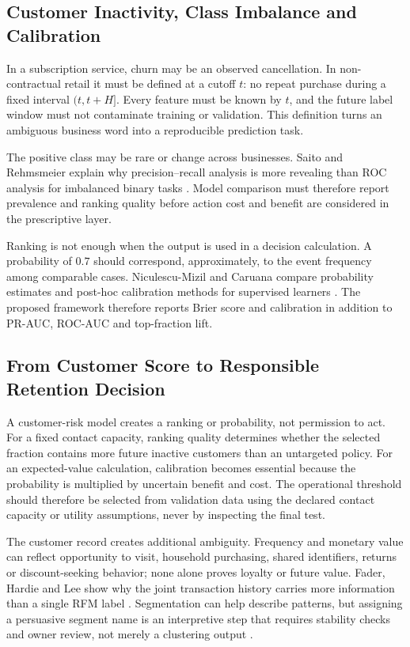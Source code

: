 \subsection{Customer Inactivity, Class Imbalance and Calibration}

In a subscription service, churn may be an observed cancellation. In
non-contractual retail it must be defined at a cutoff $t$: no repeat purchase
during a fixed interval $(t,t+H]$. Every feature must be known by $t$, and the
future label window must not contaminate training or validation. This definition
turns an ambiguous business word into a reproducible prediction task.

The positive class may be rare or change across businesses. Saito and
Rehmsmeier explain why precision--recall analysis is more revealing than ROC
analysis for imbalanced binary tasks \cite{saito2015pr}. Model comparison must
therefore report prevalence and ranking quality before action cost and benefit
are considered in the prescriptive layer.

Ranking is not enough when the output is used in a decision calculation. A
probability of $0.7$ should correspond, approximately, to the event frequency
among comparable cases. Niculescu-Mizil and Caruana compare probability
estimates and post-hoc calibration methods for supervised learners
\cite{niculescu2005calibration}. The proposed framework therefore reports Brier
score and calibration in addition to PR-AUC, ROC-AUC and top-fraction lift.

\subsection{From Customer Score to Responsible Retention Decision}

A customer-risk model creates a ranking or probability, not permission to act.
For a fixed contact capacity, ranking quality determines whether the selected
fraction contains more future inactive customers than an untargeted policy.
For an expected-value calculation, calibration becomes essential because the
probability is multiplied by uncertain benefit and cost. The operational
threshold should therefore be selected from validation data using the declared
contact capacity or utility assumptions, never by inspecting the final test.

The customer record creates additional ambiguity. Frequency and monetary value
can reflect opportunity to visit, household purchasing, shared identifiers,
returns or discount-seeking behavior; none alone proves loyalty or future value.
Fader, Hardie and Lee show why the joint transaction history carries more
information than a single RFM label \cite{fader2005rfm}. Segmentation can help
describe patterns, but assigning a persuasive segment name is an interpretive
step that requires stability checks and owner review, not merely a clustering
output \cite{rousseeuw1987silhouettes}.

